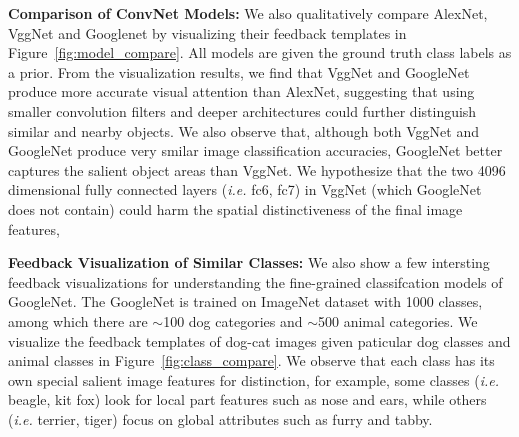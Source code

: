 \textbf{Comparison of ConvNet Models:} We also qualitatively compare AlexNet, VggNet and Googlenet by visualizing their feedback templates in Figure~\ref{fig:model_compare}. All models are given the ground truth class labels as a prior. From the visualization results, we find that VggNet and GoogleNet produce more accurate visual attention than AlexNet, suggesting that using smaller convolution filters and deeper architectures could further distinguish similar and nearby objects. We also observe that, although both VggNet and GoogleNet produce very smilar image classification accuracies, GoogleNet better captures the salient object areas than VggNet. We hypothesize that the two 4096 dimensional fully connected layers (\emph{i.e.} fc6, fc7) in VggNet (which GoogleNet does not contain) could harm the spatial distinctiveness of the final image features,  

\textbf{Feedback Visualization of Similar Classes:} We also show a few intersting feedback visualizations for understanding the fine-grained classifcation models of GoogleNet. The GoogleNet is trained on ImageNet dataset with 1000 classes, among which there are $\sim$100 dog categories and $\sim$500 animal categories. We visualize the feedback templates of dog-cat images given paticular dog classes and animal classes in Figure~\ref{fig:class_compare}. We observe that each class has its own special salient image features for distinction, for example, some classes (\emph{i.e.} beagle, kit fox) look for local part features such as nose and ears, while others (\emph{i.e.} terrier, tiger) focus on global attributes such as furry and tabby.

